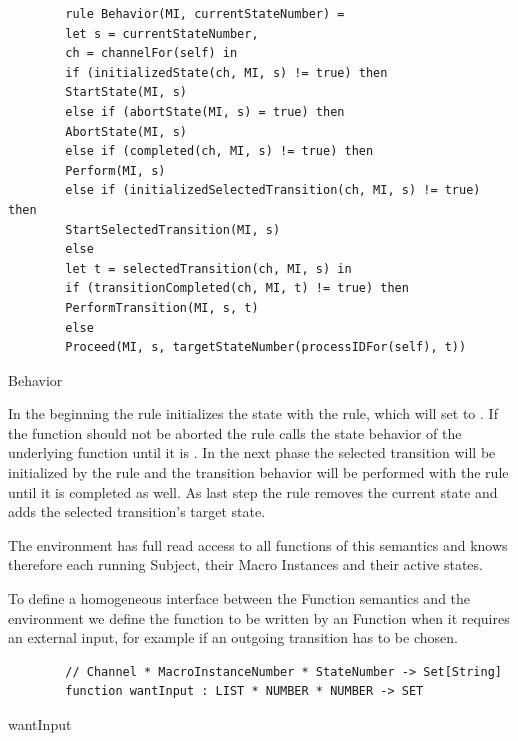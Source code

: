 \begin{listing}[H]
	\begin{verbatim}
		rule Behavior(MI, currentStateNumber) =
		let s = currentStateNumber,
		ch = channelFor(self) in
		if (initializedState(ch, MI, s) != true) then
		StartState(MI, s)
		else if (abortState(MI, s) = true) then
		AbortState(MI, s)
		else if (completed(ch, MI, s) != true) then
		Perform(MI, s)
		else if (initializedSelectedTransition(ch, MI, s) != true) then
		StartSelectedTransition(MI, s)
		else
		let t = selectedTransition(ch, MI, s) in
		if (transitionCompleted(ch, MI, t) != true) then
		PerformTransition(MI, s, t)
		else
		Proceed(MI, s, targetStateNumber(processIDFor(self), t))
	\end{verbatim}
	\caption{Behavior}
	\label{lst:shortasm:Behavior}
\end{listing}

In the beginning the  rule initializes the state with the
 rule, which will set  to
. If the function should not be aborted the 
rule calls the state behavior of the underlying function until it is
.
In the next phase the selected transition will be initialized by the
 rule and the transition behavior will be performed with
the  rule until it is completed as well. As last step
the  rule removes the current state and adds the selected
transition's target state.


The environment has full read access to all functions of this semantics and knows
therefore each running Subject, their Macro Instances and their active states.

To define a homogeneous interface between the Function semantics and the environment we
define the function  to be written by an Function when it
requires an external input, for example if an outgoing transition has to be chosen.

\begin{listing}[H]
	\begin{verbatim}
		// Channel * MacroInstanceNumber * StateNumber -> Set[String]
		function wantInput : LIST * NUMBER * NUMBER -> SET
	\end{verbatim}
	\caption{wantInput}
	\label{lst:shortasm:wantInput}
\end{listing}

